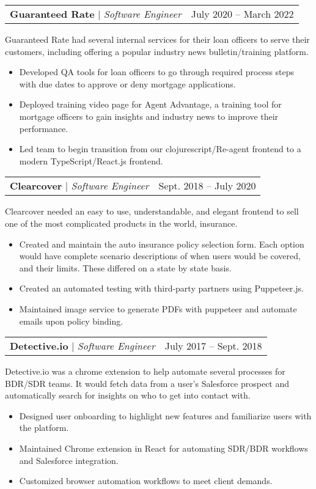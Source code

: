 \documentclass[letterpaper,11pt]{article}
\makeatletter
\newcommand{\resumeItem}[1]{
  \item\small{
    {#1 \vspace{-2pt}}}}
\newcommand{\resumeProjectHeading}[2]{
    \item
    \begin{tabular*}{0.97\textwidth}{l@{\extracolsep{\fill}}r}
      \small#1 & #2 \\
    \end{tabular*}\vspace{-4pt}
}
\newcommand{\resumeItemListStart}{\begin{itemize}\vspace{-4px}}
\newcommand{\resumeItemListEnd}{\end{itemize}\vspace{-4pt}}
\makeatother
\begin{document}
    \resumeProjectHeading
      {\textbf{Guaranteed Rate}\vspace{8pt} $|$ \footnotesize\emph{Software Engineer}}{July 2020 -- March 2022}
      \small{Guaranteed Rate had several internal services for their loan officers to serve their
      customers, including offering a popular industry news bulletin/training platform.}
      \resumeItemListStart
        \resumeItem{Developed QA tools for loan officers to go through required process steps with
        due dates to approve or deny mortgage applications.}
        \resumeItem{Deployed training video page for Agent Advantage, a training tool for mortgage
        officers to gain insights and industry news to improve their performance.}
        \resumeItem{Led team to begin transition from our clojurescript/Re-agent frontend to a
        modern TypeScript/React.js frontend.}
      \resumeItemListEnd

    \resumeProjectHeading
      {\textbf{Clearcover} $|$ \footnotesize\emph{Software Engineer}\vspace{8pt}}{Sept. 2018 -- July 2020}
      {\small{Clearcover needed an easy to use, understandable, and elegant frontend to sell
    one of the most complicated products in the world, insurance.}}
      \resumeItemListStart
        \resumeItem{Created and maintain the auto insurance policy selection form. Each option
        would have complete scenario descriptions of when users would be covered,
        and their limits. These differed on a state by state basis.}
        \resumeItem{Created an automated testing with third-party partners using Puppeteer.js.}
        \resumeItem{Maintained image service to generate PDFs with puppeteer and automate emails upon policy
        binding.}
      \resumeItemListEnd

    \resumeProjectHeading
      {\textbf{Detective.io} $|$ \footnotesize\emph{Software Engineer}\vspace{8pt}}{July 2017 -- Sept. 2018}
      {\small{Detective.io was a chrome extension to help automate several processes for
      BDR/SDR teams. It would fetch data from a user's Salesforce prospect and
      automatically search for insights on who to get into contact with.}}
      \resumeItemListStart
        \resumeItem{Designed user onboarding to highlight new features and familiarize users with
        the platform.}
        \resumeItem{Maintained Chrome extension in React for automating SDR/BDR workflows and
        Salesforce integration.}
        \resumeItem{Customized browser automation workflows to meet client demands.}
      \resumeItemListEnd
\end{document}
